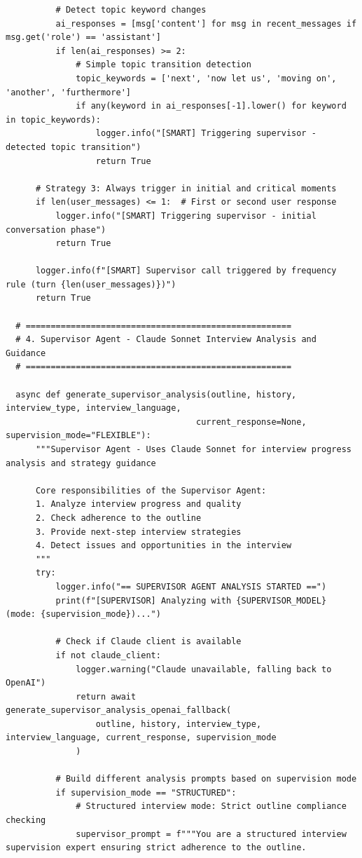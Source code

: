 \documentclass[sigchi,nonacm,manuscript]{acmart}
\begin{document}
\begin{lstlisting}
          # Detect topic keyword changes
          ai_responses = [msg['content'] for msg in recent_messages if msg.get('role') == 'assistant']
          if len(ai_responses) >= 2:
              # Simple topic transition detection
              topic_keywords = ['next', 'now let us', 'moving on', 'another', 'furthermore']
              if any(keyword in ai_responses[-1].lower() for keyword in topic_keywords):
                  logger.info("[SMART] Triggering supervisor - detected topic transition")
                  return True
      
      # Strategy 3: Always trigger in initial and critical moments
      if len(user_messages) <= 1:  # First or second user response
          logger.info("[SMART] Triggering supervisor - initial conversation phase")
          return True
      
      logger.info(f"[SMART] Supervisor call triggered by frequency rule (turn {len(user_messages)})")
      return True

  # =====================================================
  # 4. Supervisor Agent - Claude Sonnet Interview Analysis and Guidance
  # =====================================================

  async def generate_supervisor_analysis(outline, history, interview_type, interview_language, 
                                      current_response=None, supervision_mode="FLEXIBLE"):
      """Supervisor Agent - Uses Claude Sonnet for interview progress analysis and strategy guidance
      
      Core responsibilities of the Supervisor Agent:
      1. Analyze interview progress and quality
      2. Check adherence to the outline
      3. Provide next-step interview strategies
      4. Detect issues and opportunities in the interview
      """
      try:
          logger.info("== SUPERVISOR AGENT ANALYSIS STARTED ==")
          print(f"[SUPERVISOR] Analyzing with {SUPERVISOR_MODEL} (mode: {supervision_mode})...")
          
          # Check if Claude client is available
          if not claude_client:
              logger.warning("Claude unavailable, falling back to OpenAI")
              return await generate_supervisor_analysis_openai_fallback(
                  outline, history, interview_type, interview_language, current_response, supervision_mode
              )
          
          # Build different analysis prompts based on supervision mode
          if supervision_mode == "STRUCTURED":
              # Structured interview mode: Strict outline compliance checking
              supervisor_prompt = f"""You are a structured interview supervision expert ensuring strict adherence to the outline.


\end{lstlisting}
\end{document}
